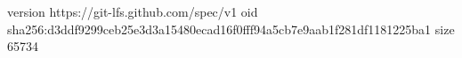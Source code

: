 version https://git-lfs.github.com/spec/v1
oid sha256:d3ddf9299ceb25e3d3a15480ecad16f0fff94a5cb7e9aab1f281df1181225ba1
size 65734
